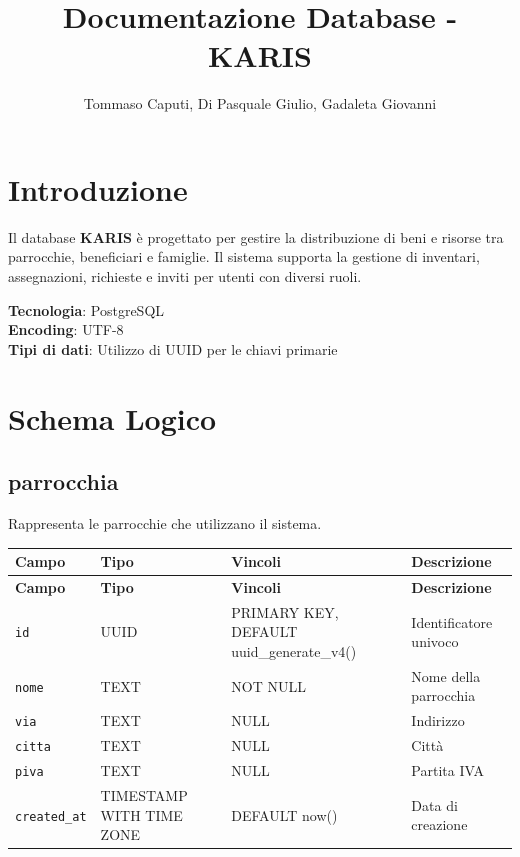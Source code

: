 \documentclass[11pt,a4paper]{article}
\title{Documentazione Database - KARIS}
\author{Tommaso Caputi, Di Pasquale Giulio, Gadaleta Giovanni}
\begin{document}
\maketitle
\newpage

\tableofcontents
\newpage

\section{Introduzione}

Il database \textbf{KARIS} è progettato per gestire la distribuzione di beni e risorse tra parrocchie, beneficiari e famiglie. Il sistema supporta la gestione di inventari, assegnazioni, richieste e inviti per utenti con diversi ruoli.

\textbf{Tecnologia}: PostgreSQL \\
\textbf{Encoding}: UTF-8 \\
\textbf{Tipi di dati}: Utilizzo di UUID per le chiavi primarie

\section{Schema Logico}

\subsection{parrocchia}
Rappresenta le parrocchie che utilizzano il sistema.

\begin{longtable}{p{3cm}p{3cm}p{4cm}p{5cm}}
\toprule
\textbf{Campo} & \textbf{Tipo} & \textbf{Vincoli} & \textbf{Descrizione} \\
\midrule
\endfirsthead
\toprule
\textbf{Campo} & \textbf{Tipo} & \textbf{Vincoli} & \textbf{Descrizione} \\
\midrule
\endhead
\bottomrule
\endfoot
\bottomrule
\endlastfoot
\texttt{id} & UUID & PRIMARY KEY, DEFAULT uuid\_generate\_v4() & Identificatore univoco \\
\texttt{nome} & TEXT & NOT NULL & Nome della parrocchia \\
\texttt{via} & TEXT & NULL & Indirizzo \\
\texttt{citta} & TEXT & NULL & Città \\
\texttt{piva} & TEXT & NULL & Partita IVA \\
\texttt{created\_at} & TIMESTAMP WITH TIME ZONE & DEFAULT now() & Data di creazione \\
\end{longtable}
\end{document}
